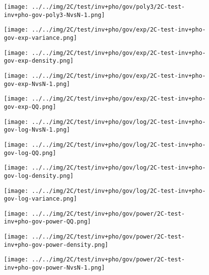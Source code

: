 \begin{figure}[H]
\centering	\texttt{[image: ../../img/2C/test/inv+pho/gov/poly3/2C-test-inv+pho-gov-poly3-NvsN-1.png]}
\end{figure}
\begin{figure}[H]
\centering	\texttt{[image: ../../img/2C/test/inv+pho/gov/exp/2C-test-inv+pho-gov-exp-variance.png]}
\end{figure}
\begin{figure}[H]
\centering	\texttt{[image: ../../img/2C/test/inv+pho/gov/exp/2C-test-inv+pho-gov-exp-density.png]}
\end{figure}
\begin{figure}[H]
\centering	\texttt{[image: ../../img/2C/test/inv+pho/gov/exp/2C-test-inv+pho-gov-exp-NvsN-1.png]}
\end{figure}
\begin{figure}[H]
\centering	\texttt{[image: ../../img/2C/test/inv+pho/gov/exp/2C-test-inv+pho-gov-exp-QQ.png]}
\end{figure}
\begin{figure}[H]
\centering	\texttt{[image: ../../img/2C/test/inv+pho/gov/log/2C-test-inv+pho-gov-log-NvsN-1.png]}
\end{figure}
\begin{figure}[H]
\centering	\texttt{[image: ../../img/2C/test/inv+pho/gov/log/2C-test-inv+pho-gov-log-QQ.png]}
\end{figure}
\begin{figure}[H]
\centering	\texttt{[image: ../../img/2C/test/inv+pho/gov/log/2C-test-inv+pho-gov-log-density.png]}
\end{figure}
\begin{figure}[H]
\centering	\texttt{[image: ../../img/2C/test/inv+pho/gov/log/2C-test-inv+pho-gov-log-variance.png]}
\end{figure}
\begin{figure}[H]
\centering	\texttt{[image: ../../img/2C/test/inv+pho/gov/power/2C-test-inv+pho-gov-power-QQ.png]}
\end{figure}
\begin{figure}[H]
\centering	\texttt{[image: ../../img/2C/test/inv+pho/gov/power/2C-test-inv+pho-gov-power-density.png]}
\end{figure}
\begin{figure}[H]
\centering	\texttt{[image: ../../img/2C/test/inv+pho/gov/power/2C-test-inv+pho-gov-power-NvsN-1.png]}
\end{figure}
